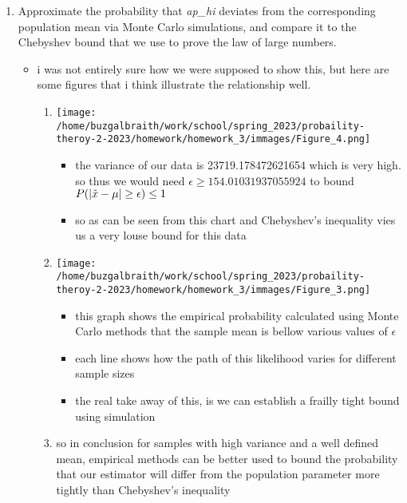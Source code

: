 \documentclass[12pt,twoside]{article}
\begin{document}
\begin{enumerate}
\begin{enumerate}
\item Approximate the probability that \textit{ap\_hi} deviates from the corresponding population mean via Monte Carlo simulations, and compare it to the Chebyshev bound that we use to prove the law of large numbers.
\begin{itemize}
\item i was not entirely sure how we were supposed to show this, but here are some figures that i think illustrate the relationship well.
\begin{enumerate}
    \item \texttt{[image: /home/buzgalbraith/work/school/spring\_2023/probaility-theroy-2-2023/homework/homework\_3/immages/Figure\_4.png]}
    \begin{itemize}
        \item the variance of our data is 23719.178472621654 which is very high. so thus we would need $\epsilon\geq154.01031937055924$ to bound $P(|\Tilde{x}-\mu|\geq \epsilon)\leq 1$
        \item so as can  be seen from this chart and Chebyshev's inequality vies us a very louse bound for this data  
    \end{itemize}
    \item \texttt{[image: /home/buzgalbraith/work/school/spring\_2023/probaility-theroy-2-2023/homework/homework\_3/immages/Figure\_3.png]}
    \begin{itemize}
        \item this graph shows the empirical probability calculated using Monte Carlo methods that the sample mean is bellow various values of $\epsilon$ 
        \item each line shows how the path of this likelihood varies for different sample sizes
        \item the real take away of this, is we can establish a frailly tight bound using simulation 
    \end{itemize}
    \item so in conclusion for samples with high variance and a well defined mean, empirical methods can be better used to bound the probability that our estimator will differ from the population parameter more tightly than Chebyshev's inequality 
\end{enumerate}
\end{itemize}
\end{enumerate}
\end{enumerate}
\end{document}
